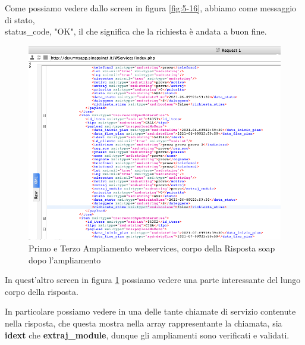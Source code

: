 \begin{flushleft}
	Come possiamo vedere dallo screen in figura \ref{fig:5-16}, abbiamo come messaggio di stato, \\status\_code, "OK", il che significa che la richiesta è andata a buon fine.
\end{flushleft}
\newpage
\begin{figure}[!h] 
	\centering
	\includegraphics[scale = 0.5]{immagini/webservices/ampliamenti/accettazione/3ampl__risposta_soap_singola-chiamata.png}
	\caption{Primo e Terzo Ampliamento webservices, corpo della Risposta \gls{soap} dopo l'ampliamento}
	\label{fig:5-17}
\end{figure}

\begin{flushleft}
	In quest'altro screen in figura \ref{fig:5-17} possiamo vedere una parte interessante del lungo corpo della risposta.
	\newspace
	
	In particolare possiamo vedere in una delle tante chiamate di servizio contenute nella risposta, che questa mostra nella array rappresentante la chiamata, sia \textbf{idext} che \textbf{extraj\_module}, dunque gli ampliamenti sono verificati e validati.
\end{flushleft}
